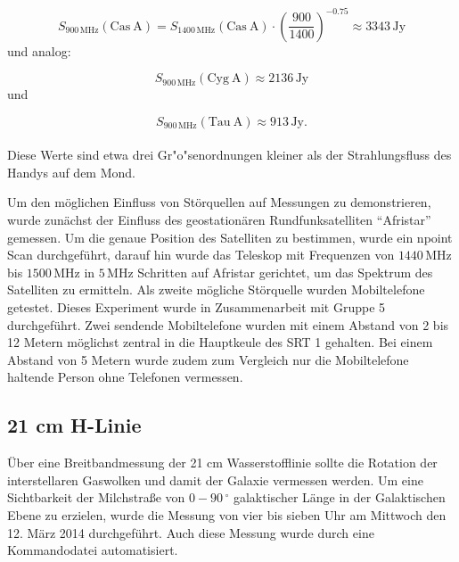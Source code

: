 \begin{equation}
S_{900 \, \mathrm{MHz}}(\mathrm{Cas\ A}) = S_{1400 \, \mathrm{MHz}}(\mathrm{Cas\ A}) \cdot \left(\frac{900}{1400}\right)^{-0.75} \approx 3343\,  \mathrm{Jy}
\end{equation} und analog:

\begin{equation}
S_{900 \, \mathrm{MHz}}(\mathrm{Cyg\ A}) \approx 2136\,  \mathrm{Jy}
\end{equation} und 

\begin{equation}
S_{900 \, \mathrm{MHz}}(\mathrm{Tau\ A}) \approx 913\, \mathrm{Jy}.
\end{equation}\\
Diese Werte sind etwa drei Gr"o"senordnungen kleiner als der Strahlungsfluss des Handys auf dem Mond. 

Um den möglichen Einfluss von Störquellen auf Messungen zu demonstrieren, wurde zunächst der Einfluss des geostationären Rundfunksatelliten \enquote{Afristar} gemessen. Um die genaue Position des Satelliten zu bestimmen, wurde ein npoint Scan durchgeführt, darauf hin wurde das Teleskop mit Frequenzen von $1440\,\mathrm{MHz}$ bis $1500\,\mathrm{MHz}$ in $5\,\mathrm{MHz}$ Schritten auf Afristar gerichtet, um das Spektrum des Satelliten zu ermitteln.
Als zweite mögliche Störquelle wurden Mobiltelefone getestet. Dieses Experiment wurde in Zusammenarbeit mit Gruppe 5 durchgeführt. Zwei sendende Mobiltelefone wurden mit einem Abstand von 2 bis 12 Metern möglichst zentral in die Hauptkeule des SRT 1 gehalten. Bei einem Abstand von 5 Metern wurde zudem zum Vergleich nur die Mobiltelefone haltende Person ohne Telefonen vermessen.
\subsection{21 cm H-Linie}
Über eine Breitbandmessung der 21 cm Wasserstofflinie sollte die Rotation der interstellaren Gaswolken und damit der Galaxie vermessen werden. Um eine Sichtbarkeit der Milchstraße von $0-90\,^\circ$ galaktischer Länge in der Galaktischen Ebene zu erzielen, wurde die Messung von vier bis sieben Uhr am Mittwoch den 12. März 2014 durchgeführt. Auch diese Messung wurde durch eine Kommandodatei automatisiert.

